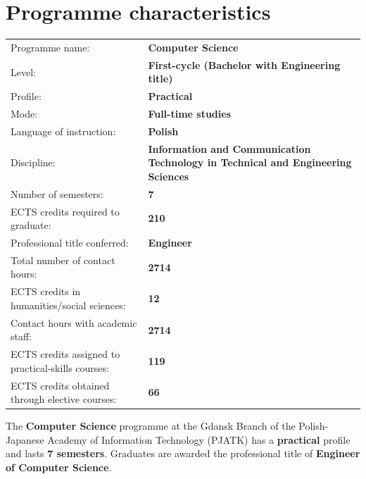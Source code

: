 \documentclass[12pt,a4paper]{article}
\renewcommand{\arraystretch}{1.35}
\begin{document}
\vspace{1cm}
\thispagestyle{empty}
\newpage
\setcounter{page}{1}

\tableofcontents
\newpage

\section{Programme characteristics}

{\renewcommand{\arraystretch}{1.4}
\begin{tabularx}{\textwidth}{@{}Xp{8.5cm}@{}}
\toprule
  {\small Programme name:} & {\small\textbf{Computer Science}} \\
  {\small Level:} & {\small\textbf{First-cycle (Bachelor with Engineering title)}} \\
  {\small Profile:} & {\small\textbf{Practical}} \\
  {\small Mode:} & {\small\textbf{Full-time studies}} \\
  {\small Language of instruction:} & {\small\textbf{Polish}} \\
  {\small Discipline:} & {\small\textbf{Information and Communication Technology in Technical and Engineering Sciences}} \\
\midrule
  {\small Number of semesters:} & {\small\textbf{7}} \\
  {\small ECTS credits required to graduate:} & {\small\textbf{210}} \\
  {\small Professional title conferred:} & {\small\textbf{Engineer}} \\
\midrule
  {\small Total number of contact hours:} & {\small\textbf{2714}} \\
  {\small ECTS credits in humanities/social sciences:} & {\small\textbf{12}} \\
  {\small Contact hours with academic staff:} & {\small\textbf{2714}} \\
  {\small ECTS credits assigned to practical-skills courses:} & {\small\textbf{119}} \\
  {\small ECTS credits obtained through elective courses:} & {\small\textbf{66}} \\
\bottomrule
\end{tabularx}}

\bigskip


\newpage

The \textbf{Computer Science} programme at the Gdansk Branch of the Polish-Japanese Academy of Information Technology (PJATK) has a \textbf{practical} profile and lasts \textbf{7 semesters}. Graduates are awarded the professional title of \textbf{Engineer of Computer Science}.
\end{document}
